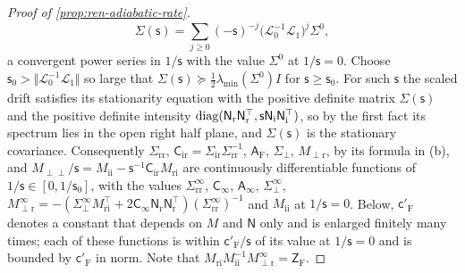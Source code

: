 \begin{proof}[Proof of \cref{prop:ren-adiabatic-rate}]
\[
\Sigma(\mathsf s)=\sum_{j\ge0}(-\mathsf s)^{-j}\bigl(\mathcal L_0^{-1}\mathcal L_1\bigr)^j\Sigma^0,
\]
a convergent power series in $1/\mathsf s$ with the value $\Sigma^0$ at $1/\mathsf s=0$. Choose $\mathsf s_0>\Vert\mathcal L_0^{-1}\mathcal L_1\Vert$ so large that $\Sigma(\mathsf s)\succeq\frac12\lambda_{\min}(\Sigma^0)I$ for $\mathsf s\ge\mathsf s_0$. For such $\mathsf s$ the scaled drift satisfies its stationarity equation with the positive definite matrix $\Sigma(\mathsf s)$ and the positive definite intensity $\operatorname{diag}(\mathsf N_{\mathrm r}\mathsf N_{\mathrm r}^\top,\mathsf s\mathsf N_{\mathrm i}\mathsf N_{\mathrm i}^\top)$, so by the first fact its spectrum lies in the open right half plane, and $\Sigma(\mathsf s)$ is the stationary covariance. Consequently $\Sigma_{\mathrm{rr}}$, $\mathsf C_{\mathrm{ir}}=\Sigma_{\mathrm{ir}}\Sigma_{\mathrm{rr}}^{-1}$, $\mathsf A_{\mathrm F}$, $\Sigma_\perp$, $M_{\perp\mathrm r}$, by its formula in (b), and $M_{\perp\perp}/\mathsf s=M_{\mathrm{ii}}-\mathsf s^{-1}\mathsf C_{\mathrm{ir}}M_{\mathrm{ri}}$ are continuously differentiable functions of $1/\mathsf s\in[0,1/\mathsf s_0]$, with the values $\Sigma^\infty_{\mathrm{rr}}$, $\mathsf C_\infty$, $\mathsf A_\infty$, $\Sigma^\infty_\perp$, $M^\infty_{\perp\mathrm r}=-(\Sigma^\infty_\perp M_{\mathrm{ri}}^\top+2\mathsf C_\infty\mathsf N_{\mathrm r}\mathsf N_{\mathrm r}^\top)(\Sigma^\infty_{\mathrm{rr}})^{-1}$ and $M_{\mathrm{ii}}$ at $1/\mathsf s=0$. Below, $\mathsf c'_{\mathrm F}$ denotes a constant that depends on $M$ and $\mathsf N$ only and is enlarged finitely many times; each of these functions is within $\mathsf c'_{\mathrm F}/\mathsf s$ of its value at $1/\mathsf s=0$ and is bounded by $\mathsf c'_{\mathrm F}$ in norm. Note that $M_{\mathrm{ri}}M_{\mathrm{ii}}^{-1}M^\infty_{\perp\mathrm r}=\mathsf Z_{\mathrm F}$.


\end{proof}
